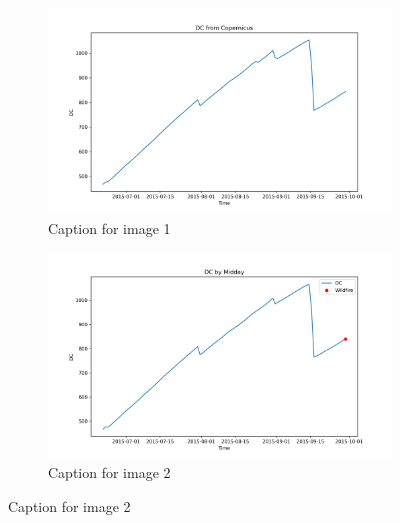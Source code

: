 \begin{figure}[h]
\caption{HELLo}
    \centering
    \begin{subfigure}{0.49\textwidth}
        \centering
        \includegraphics[width=\textwidth]{graphs/2015MesmoSitio/2015CopernicusDC12.png}
        \caption{Caption for image 1}
        \label{fig:img1}
    \end{subfigure}
    \hfill
    \begin{subfigure}{0.49\textwidth}
        \centering
        \includegraphics[width=\textwidth]{graphs/2015MesmoSitio/2015CalcDC12.png}
        \caption{Caption for image 2}
        \label{fig:img2}
    \end{subfigure}
    \label{fig:both_images}
\end{figure}


